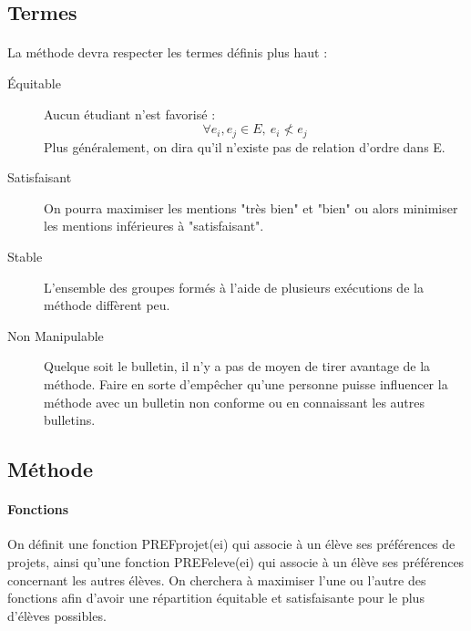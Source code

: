 \documentclass[10pt,a4paper]{article}
\begin{document}
\subsection{Termes}
\paragraph{}
La méthode devra respecter les termes définis plus haut :
\begin{description}
\item[Équitable]
Aucun étudiant n'est favorisé : 
$$\forall e_{i},e_{j} \in E,\ e_{i} \nless e_{j}$$
Plus généralement, on dira qu'il n'existe pas de relation d'ordre dans E.
\item[Satisfaisant]
On pourra maximiser les mentions "très bien" et "bien" ou alors minimiser les mentions inférieures à "satisfaisant".
\item[Stable]
L'ensemble des groupes formés à l'aide de plusieurs exécutions de la méthode diffèrent peu.
\item[Non Manipulable]
Quelque soit le bulletin, il n'y a pas de moyen de tirer avantage de la méthode. Faire en sorte d'empêcher qu'une personne puisse influencer la méthode avec un bulletin non conforme ou en connaissant les autres bulletins.
\end{description}

\subsection{Méthode}
\paragraph{Fonctions}
On définit une fonction PREFprojet(ei) qui associe à un élève ses préférences de projets, ainsi qu'une fonction PREFeleve(ei) qui associe à un élève ses préférences concernant les autres élèves.
On cherchera à maximiser l'une ou l'autre des fonctions afin d'avoir une répartition équitable et satisfaisante pour le plus d'élèves possibles.
\end{document}
